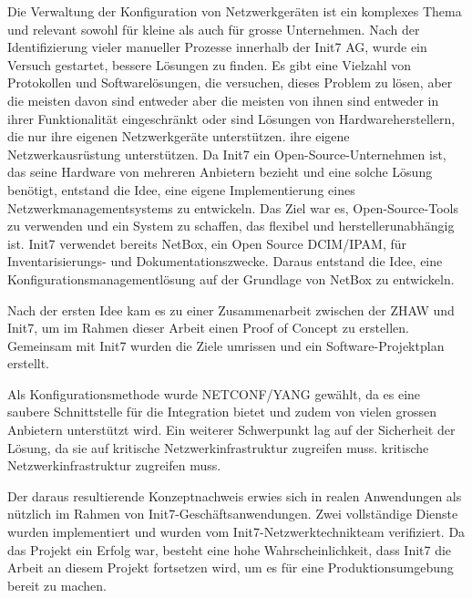 Die Verwaltung der Konfiguration von Netzwerkgeräten ist ein komplexes 
Thema und relevant sowohl für kleine als auch für grosse Unternehmen. 
Nach der Identifizierung vieler manueller Prozesse innerhalb der Init7 AG, 
wurde ein Versuch gestartet, bessere Lösungen zu finden. Es gibt eine Vielzahl 
von Protokollen und Softwarelösungen, die versuchen, dieses Problem zu lösen, 
aber die meisten davon sind entweder aber die meisten von ihnen sind entweder 
in ihrer Funktionalität eingeschränkt oder sind Lösungen von Hardwareherstellern, 
die nur ihre eigenen Netzwerkgeräte unterstützen. ihre eigene Netzwerkausrüstung unterstützen.
Da Init7 ein Open-Source-Unternehmen ist, das seine Hardware von mehreren Anbietern 
bezieht und eine solche Lösung benötigt, entstand die Idee, eine eigene Implementierung 
eines Netzwerkmanagementsystems zu entwickeln. Das Ziel war es, Open-Source-Tools zu verwenden 
und ein System zu schaffen, das flexibel und herstellerunabhängig ist. Init7 verwendet bereits 
NetBox, ein Open Source DCIM/IPAM, für Inventarisierungs- und Dokumentationszwecke. 
Daraus entstand die Idee, eine Konfigurationsmanagementlösung auf der Grundlage von NetBox zu entwickeln.

Nach der ersten Idee kam es zu einer Zusammenarbeit zwischen der ZHAW und Init7, 
um im Rahmen dieser Arbeit einen Proof of Concept zu erstellen. 
Gemeinsam mit Init7 wurden die Ziele umrissen und ein Software-Projektplan erstellt.

Als Konfigurationsmethode wurde NETCONF/YANG gewählt, da es eine saubere Schnittstelle 
für die Integration bietet und zudem von vielen grossen Anbietern unterstützt wird. 
Ein weiterer Schwerpunkt lag auf der Sicherheit der Lösung, da sie auf kritische Netzwerkinfrastruktur
zugreifen muss. kritische Netzwerkinfrastruktur zugreifen muss.

Der daraus resultierende Konzeptnachweis erwies sich in realen Anwendungen als nützlich im Rahmen 
von Init7-Geschäftsanwendungen. Zwei vollständige Dienste wurden implementiert und wurden vom 
Init7-Netzwerktechnikteam verifiziert. Da das Projekt ein Erfolg war, besteht eine hohe Wahrscheinlichkeit, 
dass Init7 die Arbeit an diesem Projekt fortsetzen wird, um es für eine Produktionsumgebung bereit zu machen.
